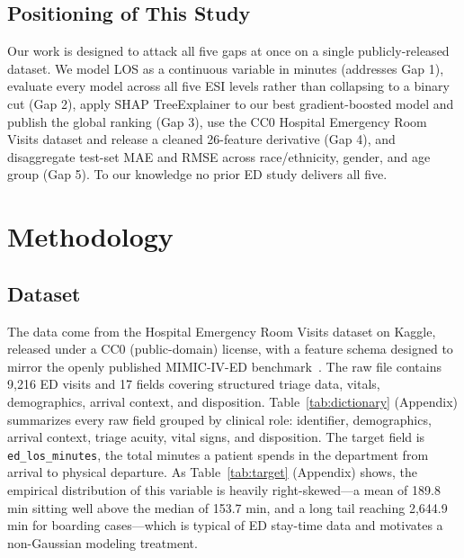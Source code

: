 \documentclass[conference]{IEEEtran}
\begin{document}
\subsection{Positioning of This Study}
Our work is designed to attack all five gaps at once on a single
publicly-released dataset. We model LOS as a continuous variable in minutes
(addresses Gap 1), evaluate every model across all five ESI levels rather
than collapsing to a binary cut (Gap 2), apply SHAP TreeExplainer to our
best gradient-boosted model and publish the global ranking (Gap 3), use the
CC0 Hospital Emergency Room Visits dataset and release a cleaned 26-feature
derivative (Gap 4), and disaggregate test-set MAE and RMSE across
race/ethnicity, gender, and age group (Gap 5). To our knowledge no prior ED
study delivers all five.

\section{Methodology}\label{sec:methods}

\subsection{Dataset}
The data come from the Hospital Emergency Room Visits dataset on Kaggle,
released under a CC0 (public-domain) license, with a feature schema designed
to mirror the openly published MIMIC-IV-ED benchmark~\cite{xie2022, mimic}.
The raw file contains 9{,}216 ED visits and 17 fields covering structured
triage data, vitals, demographics, arrival context, and disposition.
Table~\ref{tab:dictionary} (Appendix) summarizes every raw field grouped by
clinical role: identifier, demographics, arrival context, triage acuity,
vital signs, and disposition. The target field is
\texttt{ed\_los\_minutes}, the total minutes a patient spends in the
department from arrival to physical departure. As Table~\ref{tab:target}
(Appendix) shows, the empirical distribution of this variable is heavily
right-skewed---a mean of 189.8 min sitting well above the median of 153.7
min, and a long tail reaching 2{,}644.9 min for boarding cases---which is
typical of ED stay-time data and motivates a non-Gaussian modeling
treatment.
\end{document}
